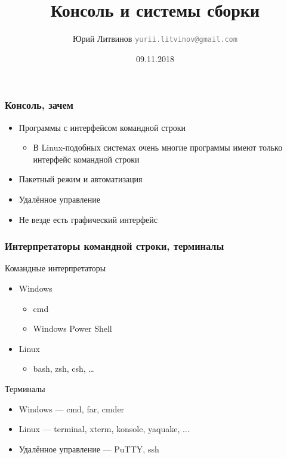 \documentclass[xetex,mathserif,serif]{beamer}
\title{Консоль и системы сборки}
\author[Юрий Литвинов]{Юрий Литвинов \newline \textcolor{gray}{\small\texttt{yurii.litvinov@gmail.com}}}
\date{09.11.2018}
\begin{document}
	
	\frame{\titlepage}

	\begin{frame}
		\frametitle{Консоль, зачем}
		\begin{itemize}
			\item Программы с интерфейсом командной строки
			\begin{itemize}
				\item В Linux-подобных системах очень многие программы имеют только интерфейс командной строки
			\end{itemize}
			\item Пакетный режим и автоматизация
			\item Удалённое управление
			\item Не везде есть графический интерфейс
		\end{itemize}
	\end{frame}

	\begin{frame}
		\frametitle{Интерпретаторы командной строки, терминалы}
		Командные интерпретаторы
		\begin{itemize}
			\item Windows
			\begin{itemize}
				\item cmd
				\item Windows Power Shell
			\end{itemize}
			\item Linux
			\begin{itemize}
				\item bash, zsh, csh, …
			\end{itemize}
		\end{itemize}
		Терминалы
		\begin{itemize}
			\item Windows --- cmd, far, cmder
			\item Linux --- terminal, xterm, konsole, yaquake, ...
			\item Удалённое управление --- PuTTY, ssh
		\end{itemize}
	\end{frame}
\end{document}
